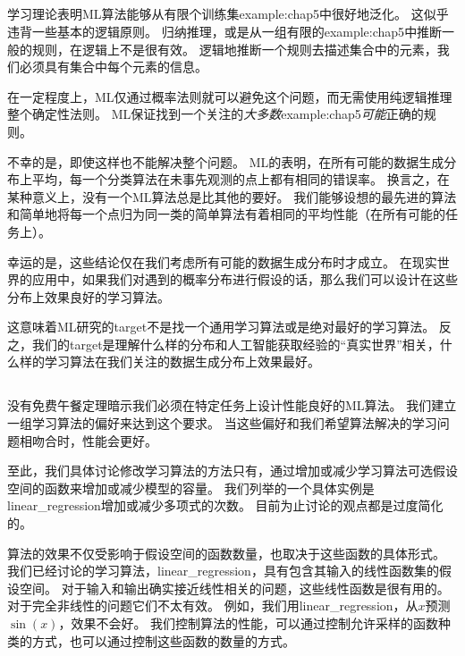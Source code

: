 \subsection{}
\label{sec:the_no_free_lunch_theorem}
学习理论表明\gls{ML}算法能够从有限个训练集\gls{example:chap5}中很好地泛化。
这似乎违背一些基本的逻辑原则。
归纳推理，或是从一组有限的\gls{example:chap5}中推断一般的规则，在逻辑上不是很有效。
逻辑地推断一个规则去描述集合中的元素，我们必须具有集合中每个元素的信息。

在一定程度上，\gls{ML}仅通过概率法则就可以避免这个问题，而无需使用纯逻辑推理整个确定性法则。
\gls{ML}保证找到一个关注的\emph{大多数}\gls{example:chap5}\emph{可能}正确的规则。

不幸的是，即使这样也不能解决整个问题。
\gls{ML}的表明，在所有可能的数据生成分布上平均，每一个分类算法在未事先观测的点上都有相同的错误率。
换言之，在某种意义上，没有一个\gls{ML}算法总是比其他的要好。
我们能够设想的最先进的算法和简单地将每一个点归为同一类的简单算法有着相同的平均性能（在所有可能的任务上）。


幸运的是，这些结论仅在我们考虑所有可能的数据生成分布时才成立。
在现实世界的应用中，如果我们对遇到的概率分布进行假设的话，那么我们可以设计在这些分布上效果良好的学习算法。

这意味着\gls{ML}研究的\gls{target}不是找一个通用学习算法或是绝对最好的学习算法。
反之，我们的\gls{target}是理解什么样的分布和人工智能获取经验的``真实世界''相关，什么样的学习算法在我们关注的数据生成分布上效果最好。

\subsection{}
\label{sec:regularization}
没有免费午餐定理暗示我们必须在特定任务上设计性能良好的\gls{ML}算法。
我们建立一组学习算法的偏好来达到这个要求。
当这些偏好和我们希望算法解决的学习问题相吻合时，性能会更好。

至此，我们具体讨论修改学习算法的方法只有，通过增加或减少学习算法可选假设空间的函数来增加或减少模型的容量。
我们列举的一个具体实例是\gls{linear_regression}增加或减少多项式的次数。
目前为止讨论的观点都是过度简化的。

算法的效果不仅受影响于假设空间的函数数量，也取决于这些函数的具体形式。
我们已经讨论的学习算法，\gls{linear_regression}，具有包含其输入的线性函数集的假设空间。
对于输入和输出确实接近线性相关的问题，这些线性函数是很有用的。
对于完全非线性的问题它们不太有效。
例如，我们用\gls{linear_regression}，从$x$预测$\sin(x)$，效果不会好。
我们控制算法的性能，可以通过控制允许采样的函数种类的方式，也可以通过控制这些函数的数量的方式。

